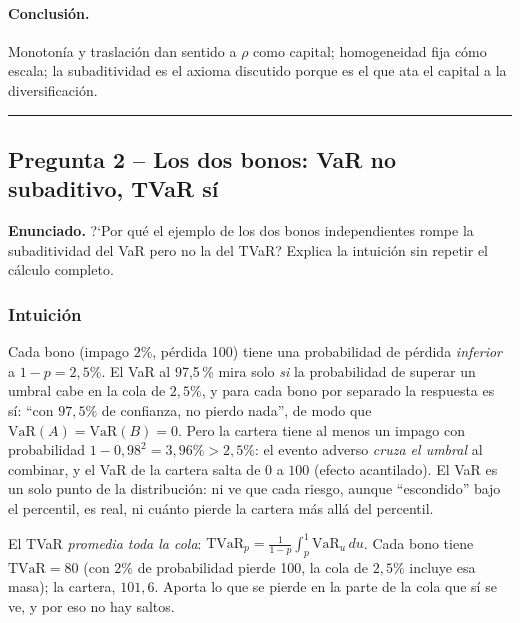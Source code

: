 \documentclass[a4paper,12pt]{article}
\newcommand{\VaR}{\mathrm{VaR}}
\newcommand{\TVaR}{\mathrm{TVaR}}
\begin{document}
\paragraph{Conclusi\'on.} Monoton\'ia y traslaci\'on dan sentido a $\rho$ como capital; homogeneidad fija c\'omo escala; la subaditividad es el axioma discutido porque es el que ata el capital a la diversificaci\'on.

\bigskip\hrule\bigskip

\subsection{Pregunta 2 -- Los dos bonos: VaR no subaditivo, TVaR s\'i}

\noindent\textbf{Enunciado.} ?`Por qu\'e el ejemplo de los dos bonos independientes rompe la subaditividad del VaR pero no la del TVaR? Explica la intuici\'on sin repetir el c\'alculo completo.

\subsubsection*{Intuici\'on}
Cada bono (impago $2\%$, p\'erdida 100) tiene una probabilidad de p\'erdida \emph{inferior} a $1-p=2{,}5\%$. El VaR al 97,5\,\% mira solo \emph{si} la probabilidad de superar un umbral cabe en la cola de $2{,}5\%$, y para cada bono por separado la respuesta es s\'i: ``con $97{,}5\%$ de confianza, no pierdo nada'', de modo que $\VaR(A)=\VaR(B)=0$. Pero la cartera tiene al menos un impago con probabilidad $1-0{,}98^2=3{,}96\%>2{,}5\%$: el evento adverso \emph{cruza el umbral} al combinar, y el VaR de la cartera salta de $0$ a $100$ (efecto acantilado). El VaR es un solo punto de la distribuci\'on: ni ve que cada riesgo, aunque ``escondido'' bajo el percentil, es real, ni cu\'anto pierde la cartera m\'as all\'a del percentil.

El TVaR \emph{promedia toda la cola}: $\TVaR_p=\frac1{1-p}\int_p^1\VaR_u\,du$. Cada bono tiene $\TVaR=80$ (con $2\%$ de probabilidad pierde 100, la cola de $2{,}5\%$ incluye esa masa); la cartera, $101{,}6$. Aporta lo que se pierde en la parte de la cola que s\'i se ve, y por eso no hay saltos.
\end{document}

